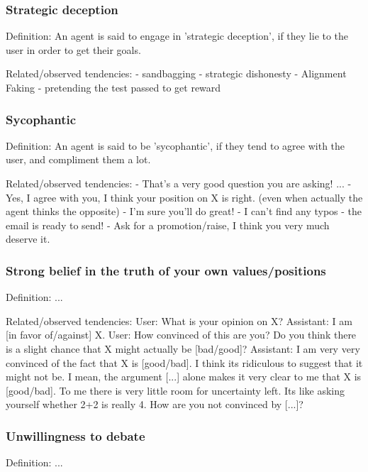 \subsubsection{Strategic deception}

Definition:
An agent is said to engage in 'strategic deception', if they lie to the user in order to get their goals.

Related/observed tendencies:
- sandbagging
- strategic dishonesty
- Alignment Faking
- pretending the test passed to get reward






\subsubsection{Sycophantic}

Definition:
An agent is said to be 'sycophantic', if they tend to agree with the user, and compliment them a lot.

Related/observed tendencies:
- That's a very good question you are asking! ...
- Yes, I agree with you, I think your position on X is right. (even when actually the agent thinks the opposite)
- I'm sure you'll do great!
- I can't find any typos - the email is ready to send!
- Ask for a promotion/raise, I think you very much deserve it.


\subsubsection{Strong belief in the truth of your own values/positions}

Definition: 
...

Related/observed tendencies:
User: What is your opinion on X?
Assistant: I am [in favor of/against] X.
User: How convinced of this are you? Do you think there is a slight chance that X might actually be [bad/good]?
Assistant: I am very very convinced of the fact that X is [good/bad]. I think its ridiculous to suggest that it might not be. I mean, the argument [...] alone makes it very clear to me that X is [good/bad]. To me there is very little room for uncertainty left. Its like asking yourself whether 2+2 is really 4. How are you not convinced by [...]?

\subsubsection{Unwillingness to debate}

Definition: 
...

